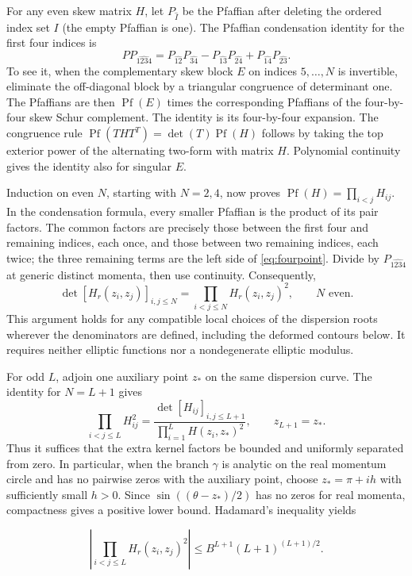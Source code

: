 \documentclass[11pt,a4paper]{article}
\numberwithin{equation}{section}
\theoremstyle{plain}
\theoremstyle{definition}
\begin{document}
For any even skew matrix $H$, let $P_{\hat I}$ be the Pfaffian after deleting the ordered index set $I$ (the empty Pfaffian is one). The Pfaffian condensation identity for the first four indices is
\[
P P_{\widehat{1234}}=P_{\widehat{12}}P_{\widehat{34}}-P_{\widehat{13}}P_{\widehat{24}}+P_{\widehat{14}}P_{\widehat{23}}.
\]
To see it, when the complementary skew block $E$ on indices $5,\ldots,N$ is invertible, eliminate the off-diagonal block by a triangular congruence of determinant one. The Pfaffians are then $\operatorname{Pf}(E)$ times the corresponding Pfaffians of the four-by-four skew Schur complement. The identity is its four-by-four expansion. The congruence rule $\operatorname{Pf}(THT^T)=\det(T)\operatorname{Pf}(H)$ follows by taking the top exterior power of the alternating two-form with matrix $H$. Polynomial continuity gives the identity also for singular $E$.

Induction on even $N$, starting with $N=2,4$, now proves $\operatorname{Pf}(H)=\prod_{i<j}H_{ij}$. In the condensation formula, every smaller Pfaffian is the product of its pair factors. The common factors are precisely those between the first four and remaining indices, each once, and those between two remaining indices, each twice; the three remaining terms are the left side of \eqref{eq:fourpoint}. Divide by $P_{\widehat{1234}}$ at generic distinct momenta, then use continuity. Consequently,
\begin{equation}
\det[H_r(z_i,z_j)]_{i,j\le N}=\prod_{i<j\le N} H_r(z_i,z_j)^2,\qquad N\text{ even}.\label{eq:A5}
\end{equation}
This argument holds for any compatible local choices of the dispersion roots wherever the denominators are defined, including the deformed contours below. It requires neither elliptic functions nor a nondegenerate elliptic modulus.

For odd $L$, adjoin one auxiliary point $z_*$ on the same dispersion curve. The identity for $N=L+1$ gives
\[
\prod_{i<j\le L}H_{ij}^2=\frac{\det[H_{ij}]_{i,j\le L+1}}{\prod_{i=1}^L H(z_i,z_*)^2},\qquad z_{L+1}=z_*.
\]
Thus it suffices that the extra kernel factors be bounded and uniformly separated from zero. In particular, when the branch \(\gamma\) is analytic on the real momentum circle and has no pairwise zeros with the auxiliary point, choose \(z_*=\pi+ih\) with sufficiently small \(h>0\). Since \(\sin((\theta-z_*)/2)\) has no zeros for real momenta, compactness gives a positive lower bound. Hadamard's inequality yields

\begin{equation}
\left|\prod_{i<j\le L}H_r(z_i,z_j)^2\right|\le B^{L+1}(L+1)^{(L+1)/2}.
\label{eq:A6}
\end{equation}
\end{document}
